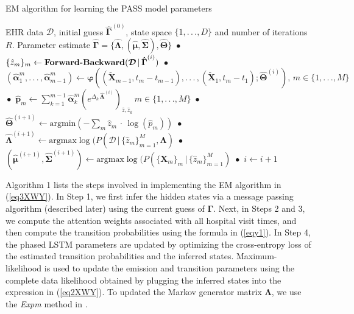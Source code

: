 \documentclass[twoside,11pt]{article}
\begin{document}
\begin{algorithm*}[t]
\caption{EM algorithm for learning the PASS model parameters}
\begin{algorithmic} 
 EHR data $\boldsymbol{\mathcal{D}}$, initial guess $\boldsymbol{\hat{\Gamma}}^{(0)}$, state space $\{1,.\,.\,.,D\}$ and number of iterations $R$.
 Parameter estimate $\boldsymbol{\hat{\Gamma}} = \{\boldsymbol{\hat{\Lambda}},(\boldsymbol{\hat{\mu}},\boldsymbol{\hat{\Sigma}}),\boldsymbol{\hat{\Theta}}\}$ 
 \,$\bullet$\, $\{\hat{z}_m\}_m \leftarrow \mbox{{\bf Forward-Backward}}(\boldsymbol{\mathcal{D}}\,|\,\boldsymbol{\hat{\Gamma}}^{(i)})$
 \,$\bullet$\, $(\boldsymbol{\hat{\alpha}}^m_{1},.\,.\,.\,,\boldsymbol{\hat{\alpha}}^m_{m-1}) \leftarrow \boldsymbol{\varphi}((\boldsymbol{\tilde{X}}_{m-1},t_{m}-t_{m-1}),.\,.\,.\,,(\boldsymbol{\tilde{X}}_{1},t_{m}-t_1) ; \boldsymbol{\hat{\Theta}}^{(i)}),\, m \in \{1,.\,.\,.,M\}$
 \,$\bullet$\, $\boldsymbol{\hat{p}}_{m} \leftarrow \sum_{k=1}^{m-1}\boldsymbol{\hat{\alpha}}^m_k (e^{\Delta_k \, \boldsymbol{\hat{\Lambda}}^{(i)}})_{\hat{z},\hat{z}_k}\, m \in \{1,.\,.\,.,M\}$
 \,$\bullet$\, $\boldsymbol{\hat{\Theta}}^{(i+1)} \leftarrow \mbox{argmin} \left(-\sum_m \hat{z}_m\,\cdot\, \log(\hat{p}_m)\right)$
 \,$\bullet$\, $\boldsymbol{\hat{\Lambda}}^{(i+1)} \leftarrow \mbox{argmax} \log(P(\boldsymbol{\mathcal{D}}\,|\,\{\hat{z}_m\}_{m=1}^M,\boldsymbol{\Lambda})$
 \,$\bullet$\, $(\boldsymbol{\hat{\mu}}^{(i+1)},\boldsymbol{\hat{\Sigma}}^{(i+1)}) \leftarrow \mbox{argmax} \log(P(\{\boldsymbol{X}_m\}_m\,|\,\{\hat{z}_m\}_{m=1}^M)$
 \,$\bullet$\, $i \leftarrow i + 1$
\ENDWHILE
\label{alg1}
\end{algorithmic}
\end{algorithm*}
Algorithm 1 lists the steps involved in implementing the EM algorithm in (\ref{eq3XWY}). In Step 1, we first infer the hidden states via a message passing algorithm (described later) using the current guess of \mbox{\footnotesize $\boldsymbol{\Gamma}$}. Next, in Steps 2 and 3, we compute the attention weights associated with all hospital visit times, and then compute the transition probabilities using the formula in (\ref{eqy1}). In Step 4, the phased LSTM parameters are updated by optimizing the cross-entropy loss of the estimated transition probabilities and the inferred states. Maximum-likelihood is used to update the emission and transition parameters using the complete data likelihood obtained by plugging the inferred states into the expression in (\ref{eq2XWY}). To updated the Markov generator matrix \mbox{\footnotesize $\boldsymbol{\Lambda}$}, we use the {\it Expm} method in \cite{liu2015efficient}.  
\end{document}
